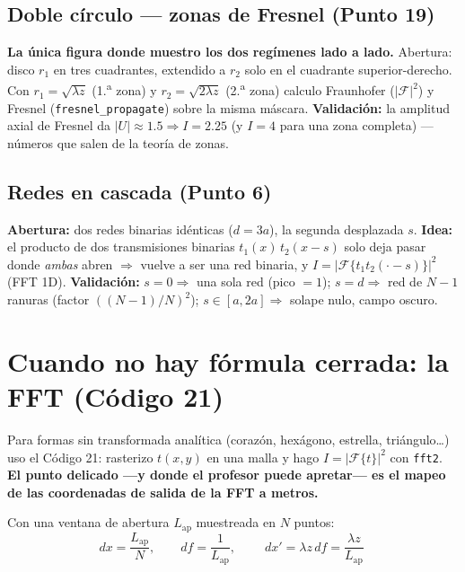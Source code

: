 \documentclass[11pt,a4paper]{article}
\newcommand{\Fou}{\mathcal{F}}
\begin{document}
\subsection{Doble círculo --- zonas de Fresnel (Punto 19)}
\textbf{La única figura donde muestro los dos regímenes lado a lado.} Abertura:
disco $r_1$ en tres cuadrantes, extendido a $r_2$ solo en el cuadrante
superior-derecho. Con $r_1=\sqrt{\lambda z}$ (1.\textsuperscript{a} zona) y
$r_2=\sqrt{2\lambda z}$ (2.\textsuperscript{a} zona) calculo Fraunhofer ($|\Fou|^2$)
y Fresnel (\texttt{fresnel\_propagate}) sobre la misma máscara.
\textbf{Validación:} la amplitud axial de Fresnel da $|U|\approx1.5\Rightarrow I=2.25$
(y $I=4$ para una zona completa) ---números que salen de la teoría de zonas.

\subsection{Redes en cascada (Punto 6)}
\textbf{Abertura:} dos redes binarias idénticas ($d=3a$), la segunda desplazada
$s$. \textbf{Idea:} el producto de dos transmisiones binarias
$t_1(x)\,t_2(x-s)$ solo deja pasar donde \emph{ambas} abren $\Rightarrow$ vuelve a
ser una red binaria, y $I=|\Fou\{t_1t_2(\cdot-s)\}|^2$ (FFT 1D).
\textbf{Validación:} $s=0\Rightarrow$ una sola red (pico $=1$); $s=d\Rightarrow$
red de $N-1$ ranuras (factor $((N-1)/N)^2$); $s\in[a,2a]\Rightarrow$ solape nulo,
campo oscuro.

\section{Cuando no hay fórmula cerrada: la FFT (Código 21)}

Para formas sin transformada analítica (corazón, hexágono, estrella, triángulo\ldots)
uso el Código 21: rasterizo $t(x,y)$ en una malla y hago $I=|\Fou\{t\}|^2$ con
\texttt{fft2}. \textbf{El punto delicado ---y donde el profesor puede apretar---
es el mapeo de las coordenadas de salida de la FFT a metros.}

Con una ventana de abertura $L_\text{ap}$ muestreada en $N$ puntos:
\begin{equation}
dx=\frac{L_\text{ap}}{N},\qquad df=\frac{1}{L_\text{ap}},\qquad
\boxed{\;dx'=\lambda z\,df=\frac{\lambda z}{L_\text{ap}}\;}
\end{equation}
\end{document}
